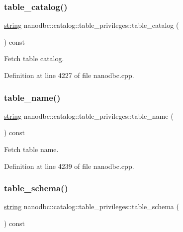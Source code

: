 \subsubsection{\texorpdfstring{table\_catalog()}{table\_catalog()}}
{\footnotesize\ttfamily \mbox{\hyperlink{namespacenanodbc_abfc0ece56278e590911ec8352774c212}{string}} nanodbc\+::catalog\+::table\+\_\+privileges\+::table\+\_\+catalog (\begin{DoxyParamCaption}{ }\end{DoxyParamCaption}) const}



Fetch table catalog. 



Definition at line 4227 of file nanodbc.\+cpp.

\mbox{\label{classnanodbc_1_1catalog_1_1table__privileges_aac883f1373e4e6d9965f93cdff781a79}} 
\subsubsection{\texorpdfstring{table\_name()}{table\_name()}}
{\footnotesize\ttfamily \mbox{\hyperlink{namespacenanodbc_abfc0ece56278e590911ec8352774c212}{string}} nanodbc\+::catalog\+::table\+\_\+privileges\+::table\+\_\+name (\begin{DoxyParamCaption}{ }\end{DoxyParamCaption}) const}



Fetch table name. 



Definition at line 4239 of file nanodbc.\+cpp.

\mbox{\label{classnanodbc_1_1catalog_1_1table__privileges_a75049bbc32d7a4e4c53a3723f3859da3}} 
\subsubsection{\texorpdfstring{table\_schema()}{table\_schema()}}
{\footnotesize\ttfamily \mbox{\hyperlink{namespacenanodbc_abfc0ece56278e590911ec8352774c212}{string}} nanodbc\+::catalog\+::table\+\_\+privileges\+::table\+\_\+schema (\begin{DoxyParamCaption}{ }\end{DoxyParamCaption}) const}



